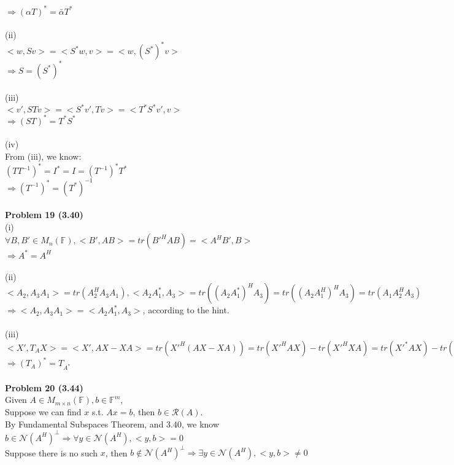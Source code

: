 \documentclass[letterpaper,12pt]{article}
\theoremstyle{definition}
\begin{document}
$\Rightarrow (\alpha T)^* = \bar{\alpha}T^*$\\
\\
(ii)\\
$<w, Sv> = <S^*w, v> = <w, (S^*)^*v>$\\
$\Rightarrow S = (S^*)^*$\\
\\
(iii)\\
$<v', STv> = <S^*v', Tv> = <T^*S^*v', v>$\\
$\Rightarrow (ST)^* = T^*S^*$\\
\\
(iv)\\
From (iii), we know:\\
$(TT^{-1})^* = I^* = I = (T^{-1})^* T^*$\\
$\Rightarrow (T^{-1})^* = (T^*)^{-1}$\\
\\
\noindent\textbf{Problem 19 (3.40)}\\
(i)\\
$\forall B, B'\in M_n(\mathbb{F}), <B', AB> = tr(B'^HAB) = <A^HB', B>$\\
$\Rightarrow A^* = A^H$\\
\\
(ii)\\
$<A_2, A_3A_1> = tr(A_2^HA_3A_1), <A_2A_1^*, A_3> = tr((A_2A_1^*)^HA_3) = tr((A_2A_1^H)^HA_3) = tr(A_1A_2^HA_3)$\\
$\Rightarrow <A_2, A_3A_1> = <A_2A_1^*, A_3>$, according to the hint.\\
\\
(iii)\\
$<X', T_AX> = <X', AX-XA> = tr(X'^H(AX-XA)) = tr(X'^HAX)-tr(X'^HXA) = tr(X'^*AX) - tr(X'^*XA) = tr(X'^*AX) - tr(AX'^*X) =  <A^*X', X> - <X'A^*, X> = <A^*X'-X'A^*, X> = <T_{A^*} X, X'>$\\
$\Rightarrow (T_A)^* = T_{A^*}$\\
\\
\noindent\textbf{Problem 20 (3.44)}\\
Given $A\in M_{m\times n}(\mathbb{F}), b\in \mathbb{F}^m$, \\
Suppose we can find $x$ s.t. $Ax = b$, then $b\in \mathscr{R}(A)$.\\
By Fundamental Subspaces Theorem, and 3.40, we know $b\in \mathscr{N}(A^H)^{\bot}\Rightarrow \forall y\in \mathscr{N}(A^H), <y, b> = 0$\\
Suppose there is no such $x$, then $b\notin \mathscr{N}(A^H)^{\bot}\Rightarrow \exists y\in \mathscr{N}(A^H), <y, b>\neq 0$\\
\end{document}
